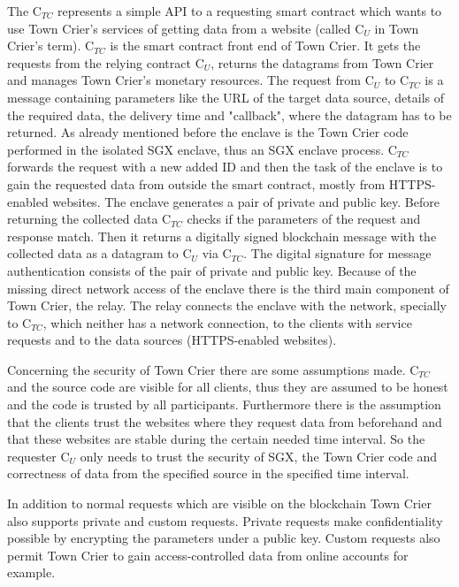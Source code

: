 \documentclass[conference]{IEEEtran}
\begin{document}
The C$_{TC}$ represents a simple API to a requesting smart contract which wants to use Town Crier's services of getting data from a website (called C$_{U}$ in Town Crier's term). C$_{TC}$ is the smart contract front end of Town Crier. It gets the requests from the relying contract C$_{U}$, returns the datagrams from Town Crier and manages Town Crier's monetary resources. The request from C$_{U}$ to C$_{TC}$ is a message containing parameters like the URL of the target data source, details of the required data, the delivery time and "callback", where the datagram has to be returned. As already mentioned before the enclave is the Town Crier code performed in the isolated SGX enclave, thus an SGX enclave process. C$_{TC}$ forwards the request with a new added ID and then the task of the enclave is to gain the requested data from outside the smart contract, mostly from HTTPS-enabled websites. The enclave generates a pair of private and public key. Before returning the collected data C$_{TC}$ checks if the parameters of the request and response match. Then it returns a digitally signed blockchain message with the collected data as a datagram to C$_{U}$ via C$_{TC}$. The digital signature for message authentication consists of the pair of private and public key. Because of the missing direct network access of the enclave there is the third main component of Town Crier, the relay. The relay connects the enclave with the network, specially to C$_{TC}$, which neither has a network connection, to the clients with service requests and to the data sources (HTTPS-enabled websites). \cite{Zhang2016} \par 
Concerning the security of Town Crier there are some assumptions made. C$_{TC}$ and the source code are visible for all clients, thus they are assumed to be honest and the code is trusted by all participants. Furthermore there is the assumption that the clients trust the websites where they request data from beforehand and that these websites are stable during the certain needed time interval. So the requester C$_{U}$ only needs to trust the security of SGX, the Town Crier code and correctness of data from the specified source in the specified time interval. \cite{Zhang2016} \par 
In addition to normal requests which are visible on the blockchain Town Crier also supports private and custom requests. Private requests make confidentiality possible by encrypting the parameters under a public key. Custom requests also permit Town Crier to gain access-controlled data from online accounts for example. \cite{Zhang2016} \par 
\end{document}
